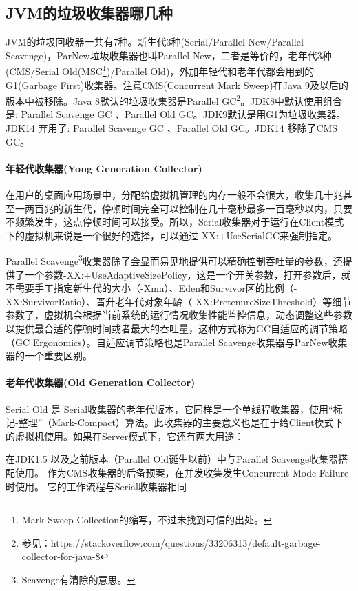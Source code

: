 \documentclass[../../../interview-questions.tex]{subfiles}
\begin{document}
\subsection{JVM的垃圾收集器哪几种}

JVM的垃圾回收器一共有7种。新生代3种(Serial/Parallel New/Parallel Scavenge)，ParNew垃圾收集器也叫Parallel New，二者是等价的，老年代3种(CMS/Serial Old(MSC\footnote{Mark Sweep Collection的缩写，不过未找到可信的出处。})/Parallel Old)，外加年轻代和老年代都会用到的G1(Garbage First)收集器。注意CMS(Concurrent Mark Sweep)在Java 9及以后的版本中被移除。Java 8默认的垃圾收集器是Parallel GC\footnote{参见：\url{https://stackoverflow.com/questions/33206313/default-garbage-collector-for-java-8}}。JDK8中默认使用组合是: Parallel Scavenge GC 、Parallel Old GC。JDK9默认是用G1为垃圾收集器。JDK14 弃用了: Parallel Scavenge GC 、Parallel Old GC。JDK14 移除了CMS GC。

\paragraph{年轻代收集器(Yong Generation Collector)}
在用户的桌面应用场景中，分配给虚拟机管理的内存一般不会很大，收集几十兆甚至一两百兆的新生代，停顿时间完全可以控制在几十毫秒最多一百毫秒以内，只要不频繁发生，这点停顿时间可以接受。所以，Serial收集器对于运行在Client模式下的虚拟机来说是一个很好的选择，可以通过-XX:+UseSerialGC来强制指定。

Parallel Scavenge\footnote{Scavenge有清除的意思。}收集器除了会显而易见地提供可以精确控制吞吐量的参数，还提供了一个参数-XX:+UseAdaptiveSizePolicy，这是一个开关参数，打开参数后，就不需要手工指定新生代的大小（-Xmn）、Eden和Survivor区的比例（-XX:SurvivorRatio）、晋升老年代对象年龄（-XX:PretenureSizeThreshold）等细节参数了，虚拟机会根据当前系统的运行情况收集性能监控信息，动态调整这些参数以提供最合适的停顿时间或者最大的吞吐量，这种方式称为GC自适应的调节策略（GC Ergonomics）。自适应调节策略也是Parallel Scavenge收集器与ParNew收集器的一个重要区别。

\paragraph{老年代收集器(Old Generation Collector)}
Serial Old 是 Serial收集器的老年代版本，它同样是一个单线程收集器，使用“标记-整理”（Mark-Compact）算法。此收集器的主要意义也是在于给Client模式下的虚拟机使用。如果在Server模式下，它还有两大用途：

在JDK1.5 以及之前版本（Parallel Old诞生以前）中与Parallel Scavenge收集器搭配使用。
作为CMS收集器的后备预案，在并发收集发生Concurrent Mode Failure时使用。
它的工作流程与Serial收集器相同
\end{document}
